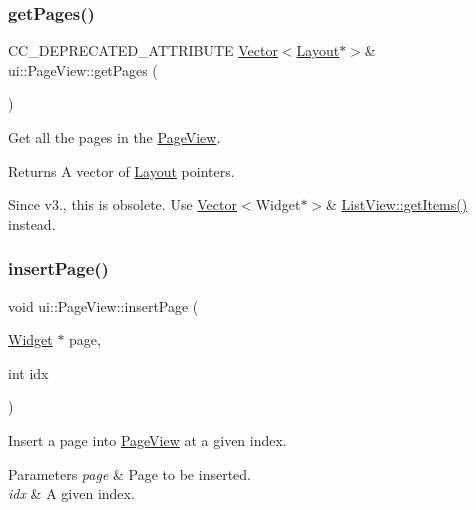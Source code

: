 \subsubsection{\texorpdfstring{get\+Pages()}{getPages()}\hspace{0.1cm}{\footnotesize\ttfamily [2/2]}}
{\footnotesize\ttfamily C\+C\+\_\+\+D\+E\+P\+R\+E\+C\+A\+T\+E\+D\+\_\+\+A\+T\+T\+R\+I\+B\+U\+TE \hyperlink{classVector}{Vector}$<$\hyperlink{classui_1_1Layout}{Layout}$\ast$$>$\& ui\+::\+Page\+View\+::get\+Pages (\begin{DoxyParamCaption}{ }\end{DoxyParamCaption})}



Get all the pages in the \hyperlink{classui_1_1PageView}{Page\+View}. 

\begin{DoxyReturn}{Returns}
A vector of \hyperlink{classui_1_1Layout}{Layout} pointers.
\end{DoxyReturn}
Since v3., this is obsolete. Use {\ttfamily \hyperlink{classVector}{Vector}$<$Widget$\ast$$>$\& \hyperlink{classui_1_1ListView_a92a6e83bdbfec80ae5133ab7ccd0a824}{List\+View\+::get\+Items()}} instead. \mbox{\label{classui_1_1PageView_ae1909f7baa4a2e38f1a90f24c428db2d}} 
\subsubsection{\texorpdfstring{insert\+Page()}{insertPage()}\hspace{0.1cm}{\footnotesize\ttfamily [1/2]}}
{\footnotesize\ttfamily void ui\+::\+Page\+View\+::insert\+Page (\begin{DoxyParamCaption}\item[{\hyperlink{classui_1_1Widget}{Widget} $\ast$}]{page,  }\item[{int}]{idx }\end{DoxyParamCaption})}

Insert a page into \hyperlink{classui_1_1PageView}{Page\+View} at a given index.


\begin{DoxyParams}{Parameters}
{\em page} & Page to be inserted. \\
\hline
{\em idx} & A given index. \\
\hline
\end{DoxyParams}
\mbox{\label{classui_1_1PageView_ae1909f7baa4a2e38f1a90f24c428db2d}} 
